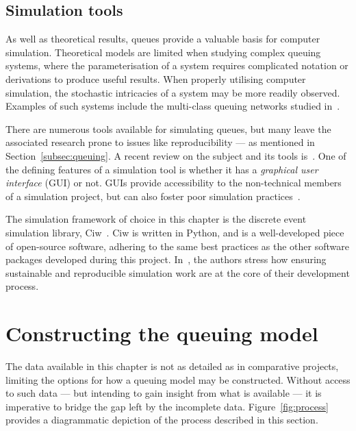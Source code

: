 \subsection{Simulation tools}\label{subsec:tools}

As well as theoretical results, queues provide a valuable basis for computer
simulation. Theoretical models are limited when studying complex queuing
systems, where the parameterisation of a system requires complicated notation or
derivations to produce useful results. When properly utilising computer
simulation, the stochastic intricacies of a system may be more readily observed.
Examples of such systems include the multi-class queuing networks studied
in~\cite{Cochran2009}.

There are numerous tools available for simulating queues, but many leave the
associated research prone to issues like reproducibility --- as mentioned in
Section~\ref{subsec:queuing}. A recent review on the subject and its tools
is~\cite{Dagkakis2016}. One of the defining features of a simulation tool is
whether it has a \emph{graphical user interface} (GUI) or not. GUIs provide
accessibility to the non-technical members of a simulation project, but can also
foster poor simulation practices~\cite{Bell1987}.

The simulation framework of choice in this chapter is the discrete event
simulation library, Ciw~\cite{Palmer2019}. Ciw is written in Python, and is a
well-developed piece of open-source software, adhering to the same best
practices as the other software packages developed during this project.
In~\cite{Palmer2019}, the authors stress how ensuring sustainable and
reproducible simulation work are at the core of their development process.


\section{Constructing the queuing model}\label{sec:model}

The data available in this chapter is not as detailed as in comparative
projects, limiting the options for how a queuing model may be constructed.
Without access to such data --- but intending to gain insight from what is
available --- it is imperative to bridge the gap left by the incomplete data.
Figure~\ref{fig:process} provides a diagrammatic depiction of the process
described in this section.

